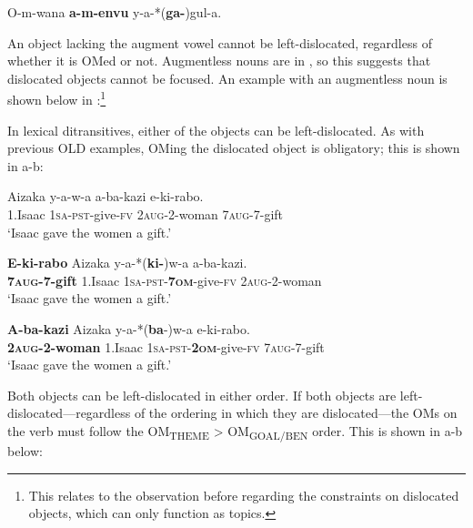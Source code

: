 \documentclass[output=paper,newtxmath,modfonts,nonflat,hidelinks]{langsci/langscibook}
\begin{document}
\ex\label{ex:ranero:14b} O-m-wana \textbf{a-m-envu}   y-a-*(\textbf{ga-})gul-a.
\z
\z

An object lacking the augment vowel cannot be left-dislocated, regardless of whether it is OMed or not. Augmentless nouns are in  \citep{Hyman1993}, so this suggests that dislocated objects cannot be focused. An example with an augmentless noun is shown below in :\footnote{This relates to the observation before regarding the  constraints on dislocated objects, which can only function as topics.}

\z

In lexical ditransitives, either of the objects can be left-dislocated. As with previous OLD examples, OMing the dislocated object is obligatory; this is shown in a-b:

\ea\label{ex:ranero:16}
\gll Aizaka y-a-w-a           a-ba-kazi     e-ki-rabo.\\
1.Isaac \textsc{1sa-pst}{}-give-\textsc{fv} 2\textsc{aug}{}-2-woman 7\textsc{aug}{}-7-gift\\
\glt ‘Isaac gave the women a gift.’
\z

\ea\label{ex:ranero:17}
\ea\label{ex:ranero:17a}
\gll \textbf{E-ki-rabo}    Aizaka y-a-*(\textbf{ki-})w-a        a-ba-kazi.\\
\textbf{7\textsc{aug}}\textbf{{}-7-gift} 1.Isaac \textsc{1sa-pst}{}-\textbf{7\textsc{om}}{}-give-\textsc{fv} 2\textsc{aug}{}-2-woman\\
\glt ‘Isaac gave the women a gift.’

\ex\label{ex:ranero:17b}
\gll \textbf{A-ba-kazi}          Aizaka y-a-*(\textbf{ba}{}-)w-a              e-ki-rabo.\\
\textbf{2\textsc{aug}}\textbf{{}-2-woman} 1.Isaac \textsc{1sa-pst}{}-\textbf{2\textsc{om}}{}-give-\textsc{fv} 7\textsc{aug}{}-7-gift\\
\glt ‘Isaac gave the women a gift.’
\z
\z

Both objects can be left-dislocated in either order. If both objects are left-dislocated—regardless of the ordering in which they are dislocated—the OMs on the verb must follow the OM\textsubscript{THEME} > OM\textsubscript{GOAL/BEN} order. This is shown in a-b below:
\end{document}
